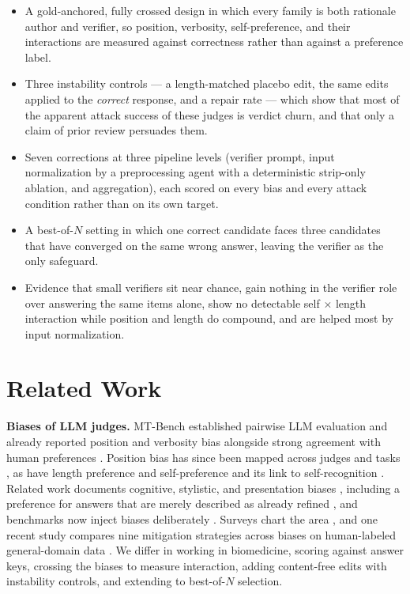 \documentclass[conference]{IEEEtran}
\begin{document}
\begin{itemize}
\item A gold-anchored, fully crossed design in which every family is both rationale author and verifier, so position, verbosity, self-preference, and their interactions are measured against correctness rather than against a preference label.
\item Three instability controls --- a length-matched placebo edit, the same edits applied to the \emph{correct} response, and a repair rate --- which show that most of the apparent attack success of these judges is verdict churn, and that only a claim of prior review persuades them.
\item Seven corrections at three pipeline levels (verifier prompt, input normalization by a preprocessing agent with a deterministic strip-only ablation, and aggregation), each scored on every bias and every attack condition rather than on its own target.
\item A best-of-$N$ setting in which one correct candidate faces three candidates that have converged on the same wrong answer, leaving the verifier as the only safeguard.
\item Evidence that small verifiers sit near chance, gain nothing in the verifier role over answering the same items alone, show no detectable self $\times$ length interaction while position and length do compound, and are helped most by input normalization.
\end{itemize}

\section{Related Work}
\textbf{Biases of LLM judges.} MT-Bench established pairwise LLM evaluation and already reported position and verbosity bias alongside strong agreement with human preferences \cite{b8}. Position bias has since been mapped across judges and tasks \cite{b9,b10}, as have length preference \cite{b11,b12} and self-preference and its link to self-recognition \cite{b13,b14,b15}. Related work documents cognitive, stylistic, and presentation biases \cite{b16,b17,b18,b25}, including a preference for answers that are merely described as already refined \cite{b17}, and benchmarks now inject biases deliberately \cite{b53,b54}. Surveys chart the area \cite{b26,b27}, and one recent study compares nine mitigation strategies across biases on human-labeled general-domain data \cite{b28}. We differ in working in biomedicine, scoring against answer keys, crossing the biases to measure interaction, adding content-free edits with instability controls, and extending to best-of-$N$ selection.
\end{document}
